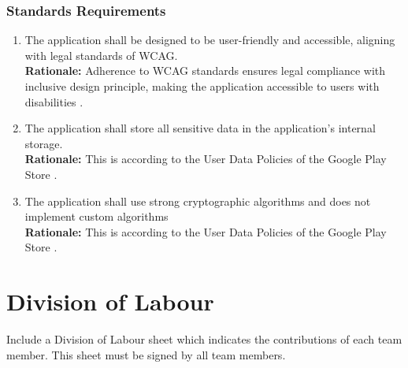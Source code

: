 \documentclass[]{article}
\begin{document}

\subsubsection{Standards Requirements}
\label{ssub:standards_requirements}
\begin{enumerate}[{LR-STD}1. ]
	\item The application shall be designed to be user-friendly and accessible, aligning with legal standards of WCAG. \\
	{\bf Rationale:} Adherence to WCAG standards ensures legal compliance with inclusive design principle, making the application accessible to users with disabilities
	\cite{2c}.
	\item The application shall store all sensitive data in the application's internal storage. \\
	{\bf Rationale:} This is according to the User Data Policies of the Google Play Store
	\cite{11c}.
	\item The application shall use strong cryptographic algorithms and does not implement custom algorithms \\
	{\bf Rationale:} This is according to the User Data Policies of the Google Play Store
	\cite{11c}.
\end{enumerate}



\appendix
\section{Division of Labour}
\label{sec:division_of_labour}
Include a Division of Labour sheet which indicates the contributions of each team member. This sheet must be signed by all team members.
\end{document}
